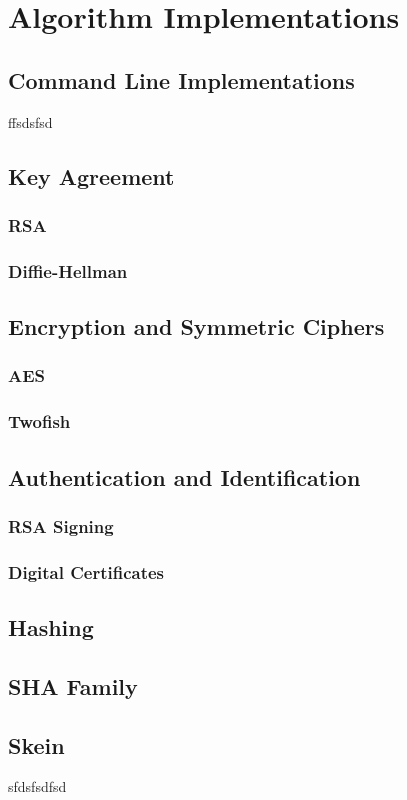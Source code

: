 
\chapter{Algorithm Implementations} %
\label{Chapter4}


\section{Command Line Implementations}

ffsdsfsd

\section{Key Agreement}

\subsection{RSA}
\subsection{Diffie-Hellman}


\section{Encryption and Symmetric Ciphers}

\subsection{AES}
\subsection{Twofish}


\section{Authentication and Identification}

\subsection{RSA Signing}
\subsection{Digital Certificates}


\section{Hashing}

\section{SHA Family}
\section{Skein}

sfdsfsdfsd